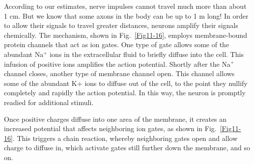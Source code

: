 According to our estimates, nerve impulses cannot travel much more than about 1 cm.  But we know that some axons in the body can be up to 1 m long!  In order to allow their signals to travel greater distances, neurons amplify their signals chemically.  The mechanism, shown in Fig.~\ref{Fig11-16}, employs membrane-bound protein channels that act as ion gates. One type of gate allows some of the abundant Na$^+$ ions in the extracellular fluid to briefly diffuse into the cell. This infusion of positive ions amplifies the action potential.  Shortly after the Na$^+$ channel closes, another type of membrane channel open. This channel allows some of the abundant K+ ions to diffuse out of the cell, to the point they nullify completely and rapidly the action potential. In this way, the neuron is promptly readied for additional stimuli.

Once positive charges diffuse into one area of the membrane, it creates an increased potential that affects neighboring ion gates, as shown in Fig.~\ref{Fig11-16}. This triggers a chain reaction, whereby neighboring gates open and allow charge to diffuse in, which activate gates still further down the membrane, and so on.

